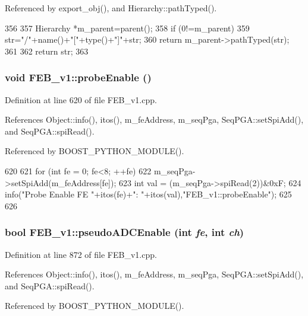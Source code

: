 Referenced by export\_\-obj(), and Hierarchy::pathTyped().


\begin{DoxyCode}
356                                            {
357   Hierarchy *m_parent=parent();
358   if (0!=m_parent){
359     str="/"+name()+"["+type()+"]"+str;
360     return m_parent->pathTyped(str);
361   }
362   return str;
363 }
\end{DoxyCode}
\hypertarget{classFEB__v1_aa9a047f616c6affac88a8d9ec984013f}{
\subsubsection[{probeEnable}]{\setlength{\rightskip}{0pt plus 5cm}void FEB\_\-v1::probeEnable ()}}
\label{classFEB__v1_aa9a047f616c6affac88a8d9ec984013f}


Definition at line 620 of file FEB\_\-v1.cpp.

References Object::info(), itos(), m\_\-feAddress, m\_\-seqPga, SeqPGA::setSpiAdd(), and SeqPGA::spiRead().

Referenced by BOOST\_\-PYTHON\_\-MODULE().


\begin{DoxyCode}
620                         {
621   for (int fe = 0; fe<8; ++fe){
622     m_seqPga->setSpiAdd(m_feAddress[fe]);
623     int val = (m_seqPga->spiRead(2))&0xF;
624     info("Probe Enable FE "+itos(fe)+": "+itos(val),"FEB_v1::probeEnable");
625   }
626 }
\end{DoxyCode}
\hypertarget{classFEB__v1_aeb6c988faf48d93637ef669c54e25223}{
\subsubsection[{pseudoADCEnable}]{\setlength{\rightskip}{0pt plus 5cm}bool FEB\_\-v1::pseudoADCEnable (int {\em fe}, \/  int {\em ch})}}
\label{classFEB__v1_aeb6c988faf48d93637ef669c54e25223}


Definition at line 872 of file FEB\_\-v1.cpp.

References Object::info(), itos(), m\_\-feAddress, m\_\-seqPga, SeqPGA::setSpiAdd(), and SeqPGA::spiRead().

Referenced by BOOST\_\-PYTHON\_\-MODULE().


